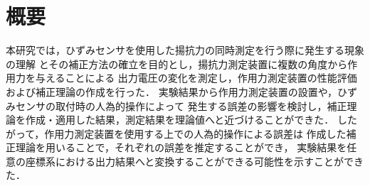 
\maketitle
\section*{概要}

本研究では，ひずみセンサを使用した揚抗力の同時測定を行う際に発生する現象の理解
とその補正方法の確立を目的とし，揚抗力測定装置に複数の角度から作用力を与えることによる
出力電圧の変化を測定し，作用力測定装置の性能評価および補正理論の作成を行った．
実験結果から作用力測定装置の設置や，ひずみセンサの取付時の人為的操作によって
発生する誤差の影響を検討し，補正理論を作成・適用した結果，測定結果を理論値へと近づけることができた．
したがって，作用力測定装置を使用する上での人為的操作による誤差は
作成した補正理論を用いることで，それぞれの誤差を推定することができ，
実験結果を任意の座標系における出力結果へと変換することができる可能性を示すことができた．

\newpage
\setcounter{tocdepth}{2}
\tableofcontents
\newpage

